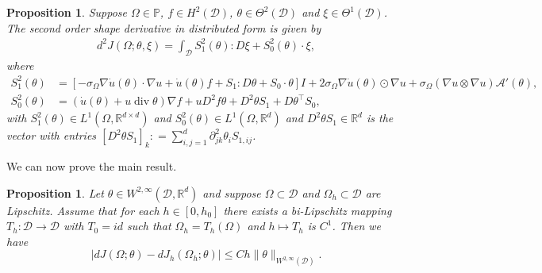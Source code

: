 \documentclass[preprint,9pt]{elsarticle}
\newcommand{\Om}{\Omega}
\newcommand{\divv}{\operatorname{div}}
\newcommand{\ta}{\theta}
\newcommand{\R}{\mathbb{R}}
\newcommand{\hold}{\mathcal{D}}
\newcommand{\Wb}{S^{2}}
\newcommand{\Sb}{S}
\newtheorem{proposition}[thm]{Proposition}
\begin{document}
\begin{proposition}\label{207}
  Suppose $\Om\in\mathds{P}$, $f\in H^2(\hold)$,  $\ta\in \Theta^2(\mathcal{D})$ and $\xi\in \Theta^1(\mathcal{D})$.
  The second order shape derivative in distributed form  is given by
  \begin{align}\label{Eulerian_sh}
  d^2 J(\Om;\ta,\xi) = \int_{\mathcal{D}} \Wb_1(\ta) : D\xi + \Wb_0(\ta)\cdot\xi,
  \end{align}
  where
  \begin{align}
  \label{103.1}
  \Wb_1(\ta) 
  & =   [
  - \sigma_\Om\nabla \dot u(\ta)\cdot\nabla u
  + \dot u(\ta)f
  +\Sb_1 : D\ta 
  +\Sb_0 \cdot \ta ] I
  + 2\sigma_\Om\nabla\dot u(\ta)\odot \nabla u
  +\sigma_\Om (\nabla u \otimes \nabla u)\mathcal{A}'(\ta),\\
  \label{103.2} \Wb_0(\ta) 
  & =  (\dot u(\ta) + u\divv\ta)\nabla f + u D^2f\ta + D^2\ta \Sb_1  + D\ta^\top \Sb_0 ,
  \end{align}
  with $\Wb_1(\ta)\in L^1(\Om,\R^{d\times d})$ and $\Wb_0(\ta)\in L^1(\Om,\R^d)$ and $D^2\ta \Sb_1\in\R^d$ is the vector with entries $[D^2\ta \Sb_1]_k: = \sum_{i, j=1}^d \partial^2_{jk}\theta_i S_{1,ij}$.
  \end{proposition}

We can now prove the main  result.
\begin{proposition}\label{prop2}
Let $\ta\in W^{2,\infty}(\mathcal{D},\R^d)$ and suppose $\Om\subset\mathcal{D}$ and $\Om_h\subset\mathcal{D}$ are Lipschitz.
Assume that for each $h\in [0,h_0]$ there exists a bi-Lipschitz mapping $T_h:\mathcal{D}\to \mathcal{D}$ with  $T_0 = id$ such that $\Om_h = T_h(\Om)$ and $h\mapsto T_h$ is $C^1$.
Then we have 
$$|dJ(\Om;\ta) - dJ_h(\Om_h;\ta)| \leq C h \|\ta\|_{W^{2,\infty}(\mathcal{D})}. $$
\end{proposition}  
\end{document}

